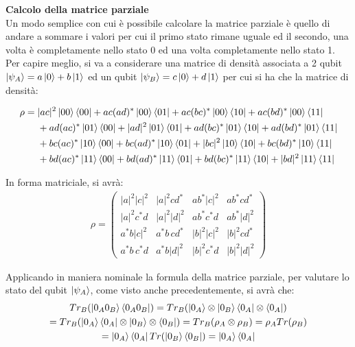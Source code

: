 \begin{info}
\textbf{Calcolo della matrice parziale}\\
Un modo semplice con cui è possibile calcolare la matrice parziale è quello di andare a sommare i valori per cui il primo stato rimane uguale ed il secondo, una volta è completamente nello stato 0 ed una volta completamente nello stato 1. Per capire meglio, si va a considerare una matrice di densità associata a 2 qubit \(\ket{\psi_A} = a \ket{0} + b \ket{1}\) ed un qubit \(\ket{\psi_B} = c \ket{0} + d \ket{1} \) per cui si ha che la matrice di densità:

\begin{align*}
\rho ={}& |ac|^2\ket{00}\bra{00} + ac(ad)^*\ket{00}\bra{01} + ac(bc)^*\ket{00}\bra{10} + ac(bd)^*\ket{00}\bra{11}\\
&+ ad(ac)^*\ket{01}\bra{00} + |ad|^2\ket{01}\bra{01} + ad(bc)^*\ket{01}\bra{10} + ad(bd)^*\ket{01}\bra{11}\\
&+ bc(ac)^*\ket{10}\bra{00} + bc(ad)^*\ket{10}\bra{01} + |bc|^2\ket{10}\bra{10} + bc(bd)^*\ket{10}\bra{11}\\
&+ bd(ac)^*\ket{11}\bra{00} + bd(ad)^*\ket{11}\bra{01} + bd(bc)^*\ket{11}\bra{10} + |bd|^2\ket{11}\bra{11}
\end{align*}

In forma matriciale, si avrà:
\begin{gather*}
\rho =
\left(\begin{smallmatrix}
|a|^2|c|^2 & |a|^2 cd^* & ab^*|c|^2 & ab^*cd^*\\
|a|^2 c^*d & |a|^2|d|^2 & ab^*c^*d & ab^*|d|^2\\
a^*b|c|^2 & a^*b\,cd^* & |b|^2|c|^2 & |b|^2cd^*\\
a^*b\,c^*d & a^*b|d|^2 & |b|^2c^*d & |b|^2|d|^2
\end{smallmatrix}\right)
\end{gather*}

Applicando in maniera nominale la formula della matrice parziale, per valutare lo stato del qubit \(\ket{\psi_A}\), come visto anche precedentemente, si avrà che:
\begin{gather*}
Tr_B(\ket{0_A 0_B}\bra{0_A 0_B})=Tr_B(\ket{0_A} \otimes \ket{0_B} \bra{0_A} \otimes \bra{0_A})\\
=Tr_B(\ket{0_A}\bra{0_A} \otimes \ket{0_B} \otimes \bra{0_B}) = Tr_B(\rho_A \otimes \rho_B) = \rho_A Tr(\rho_B)\\
= \ket{0_A}\bra{0_A}Tr(\ket{0_B}\bra{0_B}) = \ket{0_A}\bra{0_A}
\end{gather*}


\end{info}
